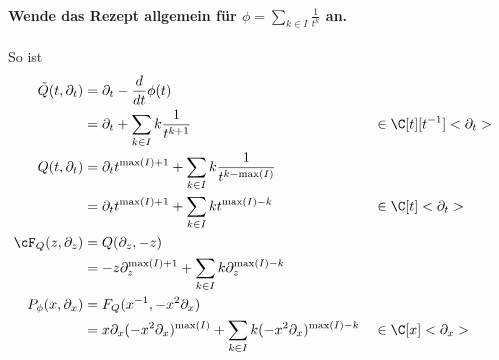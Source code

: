 \begin{comment}
warum sind diese wichtig??
\end{comment}

\paragraph{Wende das Rezept allgemein für
$\phi=\sum_{k\in I}\frac{1}{t^{k}}$ an.}
So ist
\begin{align*}
\tilde Q(t,\partial_t) &=\partial_t-\frac{d}{dt}\phi(t) \\
                       &=\partial_t+\sum_{k\in I} k\frac{1}{t^{k+1}}
                       & &\in \C[t][t^{-1}]<\partial_t>\\
Q(t,\partial_t)        &=\partial_tt^{\max(I)+1}
                         +\sum_{k\in I} k\frac{1}{t^{k-\max(I)}} \\
                       &=\partial_tt^{\max(I)+1}
                         +\sum_{k\in I} kt^{\max(I)-k}
                       & &\in \C[t]<\partial_t>\\
\cF_Q(z,\partial_z)    &=Q(\partial_z,-z)\\
                       &=-z\partial_z^{\max(I)+1}
                         +\sum_{k\in I} k\partial_z^{\max(I)-k} \\
P_{\phi}(x,\partial_x) &=F_Q(x^{-1},-x^2\partial_x) \\
                       &=x\partial_x(-x^2\partial_x)^{\max(I)}
                         +\sum_{k\in I} k(-x^2\partial_x)^{\max(I)-k}
                       & &\in \C[x]<\partial_x>
\end{align*}

